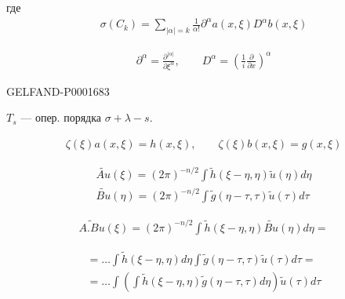 где
\begin{gather*}
\sigma(C_k)=\sum_{|\alpha|=k}\frac{1}{\alpha!}
\partial^\alpha a(x,\xi)D^\alpha b(x,\xi)
\end{gather*}

\begin{gather*}
\partial^\alpha=\frac{\partial^{|\alpha|}}{\partial\xi^\alpha},\qquad
D^\alpha=\left(\frac{1}{i}\frac{\partial}{\partial x}\right)^\alpha
\end{gather*}

\begin{GelfandAdjacentEvidence}{GELFAND-P000168}{3}
\end{GelfandAdjacentEvidence}




$T_s$ — опер. порядка $\sigma+\lambda-s$.

\begin{gather*}
\zeta(\xi)a(x,\xi)=h(x,\xi),\qquad
\zeta(\xi)b(x,\xi)=g(x,\xi)
\end{gather*}

\begin{gather*}
\widetilde{Au}(\xi)=(2\pi)^{-n/2}
\int\widetilde h(\xi-\eta,\eta)\widetilde u(\eta)d\eta\\
\widetilde{Bu}(\eta)=(2\pi)^{-n/2}
\int\widetilde g(\eta-\tau,\tau)\widetilde u(\tau)d\tau
\end{gather*}

\begin{gather*}
\widetilde{A.Bu}(\xi)=(2\pi)^{-n/2}
\int\widetilde h(\xi-\eta,\eta)\widetilde{Bu}(\eta)d\eta=
\end{gather*}

\begin{gather*}
=\ldots\int\widetilde h(\xi-\eta,\eta)d\eta
\int\widetilde g(\eta-\tau,\tau)\widetilde u(\tau)d\tau=\\
=\ldots\int\left(\int\widetilde h(\xi-\eta,\eta)
\widetilde g(\eta-\tau,\tau)d\eta\right)\widetilde u(\tau)d\tau
\end{gather*}


